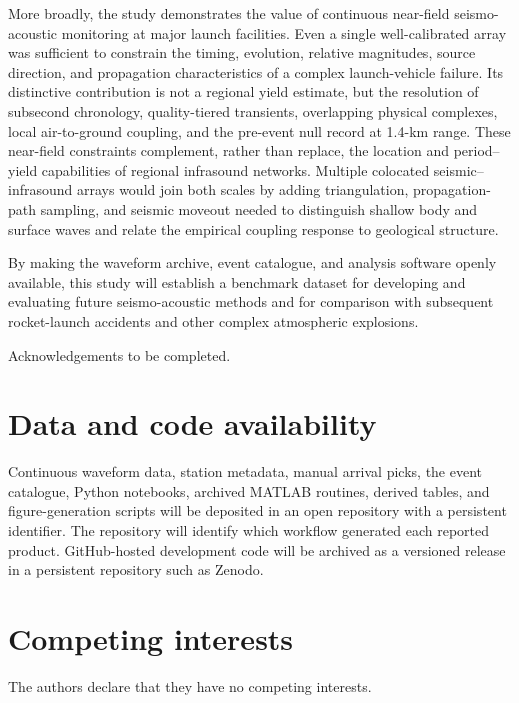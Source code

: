 \documentclass[]{seismica}
\begin{document}
More broadly, the study demonstrates the value of continuous near-field
seismo-acoustic monitoring at major launch facilities. Even a single
well-calibrated array was sufficient to constrain the timing, evolution,
relative magnitudes, source direction, and propagation characteristics of a
complex launch-vehicle failure. Its distinctive contribution is not a regional
yield estimate, but the resolution of subsecond chronology, quality-tiered
transients, overlapping physical complexes, local air-to-ground coupling, and
the pre-event null record at 1.4-km range. These near-field constraints
complement, rather than replace, the location and period--yield capabilities of
regional infrasound networks. Multiple colocated seismic--infrasound arrays
would join both scales by adding triangulation, propagation-path sampling, and
seismic moveout needed to distinguish shallow body and surface waves and relate
the empirical coupling response to geological structure.

By making the waveform archive, event catalogue, and analysis software openly available, this study will establish a benchmark dataset for developing and evaluating future seismo-acoustic methods and for comparison with subsequent rocket-launch accidents and other complex atmospheric explosions.

\begin{acknowledgements}
Acknowledgements to be completed.
\end{acknowledgements}

\section*{Data and code availability}

Continuous waveform data, station metadata, manual arrival picks, the event catalogue, Python notebooks, archived MATLAB routines, derived tables, and figure-generation scripts will be deposited in an open repository with a persistent identifier. The repository will identify which workflow generated each reported product. GitHub-hosted development code will be archived as a versioned release in a persistent repository such as Zenodo.

\section*{Competing interests}

The authors declare that they have no competing interests.


\end{document}
